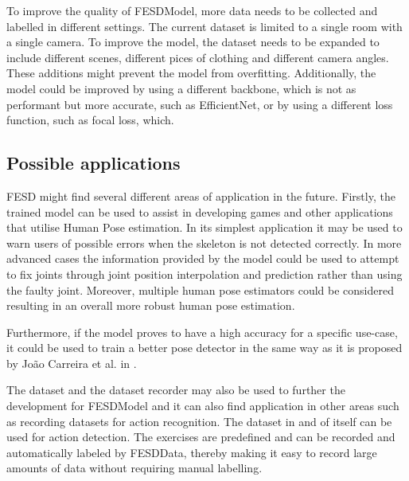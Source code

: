 To improve the quality of FESDModel, more data needs to be collected and labelled in different settings. The current dataset is limited to a single room with a single camera. To improve the model, the dataset needs to be expanded to include different scenes, different pices of clothing and different camera angles. These additions might prevent the model from overfitting. Additionally, the model could be improved by using a different backbone, which is not as performant but more accurate, such as EfficientNet, or by using a different loss function, such as focal loss, which.

\subsection{Possible applications}

FESD might find several different areas of application in the future. Firstly, the trained model can be used to assist in developing games and other applications that utilise Human Pose estimation. In its simplest application it may be used to warn users of possible errors when the skeleton is not detected correctly. In more advanced cases the information provided by the model could be used to attempt to fix joints through joint position interpolation and prediction rather than using the faulty joint. Moreover, multiple human pose estimators could be considered resulting in an overall more robust human pose estimation.

Furthermore, if the model proves to have a high accuracy for a specific use-case, it could be used to train a better pose detector in the same way as it is proposed by Jo\~ao Carreira et al. in \cite{IterativeErrorFeedback}.

The dataset and the dataset recorder may also be used to further the development for FESDModel and it can also find application in other areas such as recording datasets for action recognition. The dataset in and of itself can be used for action detection. The exercises are predefined and can be recorded and automatically labeled by FESDData, thereby making it easy to record large amounts of data without requiring manual labelling.